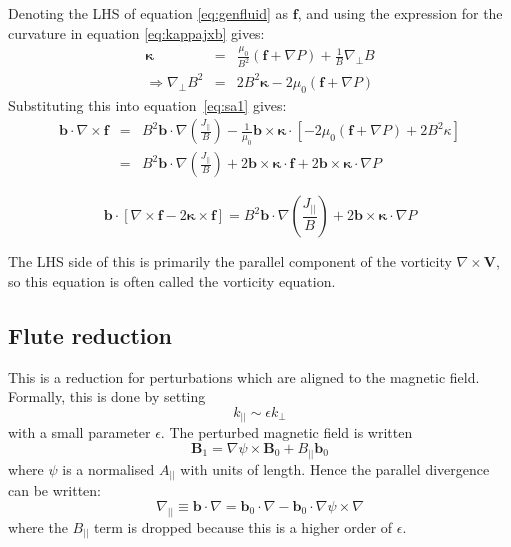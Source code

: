 \documentclass[12pt, a4paper]{article}
\newcommand{\Vec}[1]{\ensuremath{\mathbf{#1}}}
\newcommand{\Bvec}{\Vec{B}}
\newcommand{\Curl}[1]{\ensuremath{\nabla\times #1 }}
\begin{document}
Denoting the LHS of equation \ref{eq:genfluid} as $\Vec{f}$, and using the expression
for the curvature in equation \ref{eq:kappajxb} gives:
\begin{eqnarray*}
\Vec{\kappa} &=& \frac{\mu_0}{B^2}\left(\Vec{f} + \nabla P\right) + \frac{1}{B}\nabla_\perp B \\
\Rightarrow \nabla_\perp B^2 &=& 2B^2\Vec{\kappa} - 2\mu_0\left(\Vec{f} + \nabla P\right)
\end{eqnarray*}
Substituting this into equation~\ref{eq:sa1} gives:
\begin{eqnarray*}
\Vec{b}\cdot\Curl{\Vec{f}} &=& B^2\Vec{b}\cdot\nabla\left(\frac{J_{||}}{B}\right) - \frac{1}{\mu_0}\Vec{b}\times\Vec{\kappa}\cdot\left[-2\mu_0\left(\Vec{f} + \nabla P\right) + 2B^2\kappa\right] \\
&=& B^2\Vec{b}\cdot\nabla\left(\frac{J_{||}}{B}\right) + 2\Vec{b}\times\Vec{\kappa}\cdot\Vec{f} + 2\Vec{b}\times\Vec{\kappa}\cdot\nabla P
\end{eqnarray*}

\begin{equation}
\Vec{b}\cdot\left[\Curl{\Vec{f}} - 2\Vec{\kappa}\times\Vec{f}\right] = B^2\Vec{b}\cdot\nabla\left(\frac{J_{||}}{B}\right) + 2\Vec{b}\times\Vec{\kappa}\cdot\nabla P
\label{eq:shearalfven}
\end{equation}

The LHS side of this is primarily the parallel component of the vorticity
$\Curl{\Vec{V}}$, so this equation is often called the vorticity equation.

\subsection{Flute reduction}

This is a reduction for perturbations which are aligned to the magnetic field. Formally,
this is done by setting
\[
k_{||} \sim \epsilon k_\perp
\]
with a small parameter $\epsilon$. The perturbed magnetic field is written
\begin{equation}
\Bvec_1 = \nabla\psi\times\Bvec_0 + B_{||}\Vec{b}_0
\end{equation}
where $\psi$ is a normalised $A_{||}$ with units of length. Hence the parallel
divergence can be written:
\begin{equation}
\nabla_{||} \equiv \Vec{b}\cdot\nabla = \Vec{b}_0\cdot\nabla - \Vec{b}_0\cdot\nabla\psi\times\nabla
\end{equation}
where the $B_{||}$ term is dropped because this is a higher order of $\epsilon$.
\end{document}
